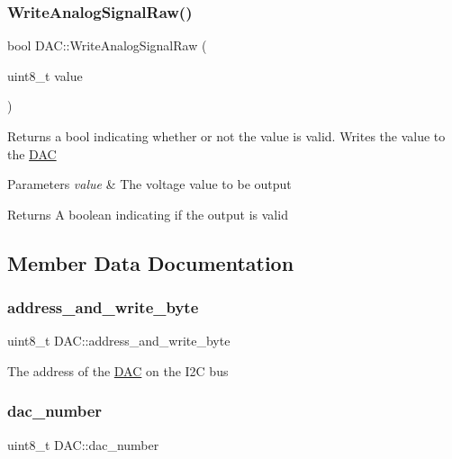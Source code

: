 \subsubsection{\texorpdfstring{Write\+Analog\+Signal\+Raw()}{WriteAnalogSignalRaw()}}
{\footnotesize\ttfamily bool D\+A\+C\+::\+Write\+Analog\+Signal\+Raw (\begin{DoxyParamCaption}\item[{uint8\+\_\+t}]{value }\end{DoxyParamCaption})}

Returns a bool indicating whether or not the value is valid. Writes the value to the \hyperlink{class_d_a_c}{D\+AC} 
\begin{DoxyParams}{Parameters}
{\em value} & The voltage value to be output \\
\hline
\end{DoxyParams}
\begin{DoxyReturn}{Returns}
A boolean indicating if the output is valid 
\end{DoxyReturn}


\subsection{Member Data Documentation}
\hypertarget{class_d_a_c_a1dd1e9c4a63f493da44d7208e59cc83e}{}\label{class_d_a_c_a1dd1e9c4a63f493da44d7208e59cc83e} 
\subsubsection{\texorpdfstring{address\+\_\+and\+\_\+write\+\_\+byte}{address\_and\_write\_byte}}
{\footnotesize\ttfamily uint8\+\_\+t D\+A\+C\+::address\+\_\+and\+\_\+write\+\_\+byte\hspace{0.3cm}{\ttfamily [private]}}

The address of the \hyperlink{class_d_a_c}{D\+AC} on the I2C bus \hypertarget{class_d_a_c_afb39aacc3401c892403c477f857504f8}{}\label{class_d_a_c_afb39aacc3401c892403c477f857504f8} 
\subsubsection{\texorpdfstring{dac\+\_\+number}{dac\_number}}
{\footnotesize\ttfamily uint8\+\_\+t D\+A\+C\+::dac\+\_\+number\hspace{0.3cm}{\ttfamily [private]}}

